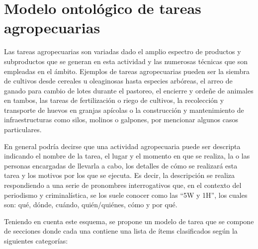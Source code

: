\section{Modelo ontológico de tareas agropecuarias} \label{sec:modelo} 

Las tareas agropecuarias son variadas dado el amplio espectro de productos y subproductos que se generan en esta actividad y las numerosas técnicas que son empleadas en el ámbito. Ejemplos de tareas agropecuarias pueden ser la siembra de cultivos desde cereales u oleaginosas hasta especies arbóreas, el arreo de ganado para cambio de lotes durante el pastoreo, el encierre y ordeñe de animales en tambos, las tareas de fertilización o riego de cultivos, la recolección y transporte de huevos en granjas apícolas o la construcción y mantenimiento de infraestructuras como silos, molinos o galpones, por mencionar algunos casos particulares. 

En general podría decirse que una actividad agropecuaria puede ser descripta indicando el nombre de la tarea, el lugar y el momento en que se realiza, la o las personas encargadas de llevarla a cabo, los detalles de cómo se realizará esta tarea y los motivos por los que se ejecuta. Es decir, la descripción se realiza respondiendo a una serie de pronombres interrogativos que, en el contexto del periodismo y criminalística, se los suele conocer como las ``5W y 1H'', los cuales son: qué, dónde, cuándo, quién/quiénes, cómo y por qué.

Teniendo en cuenta este esquema, se propone un modelo de tarea que se compone de secciones donde cada una contiene una lista de ítems clasificados según la siguientes categorías:

